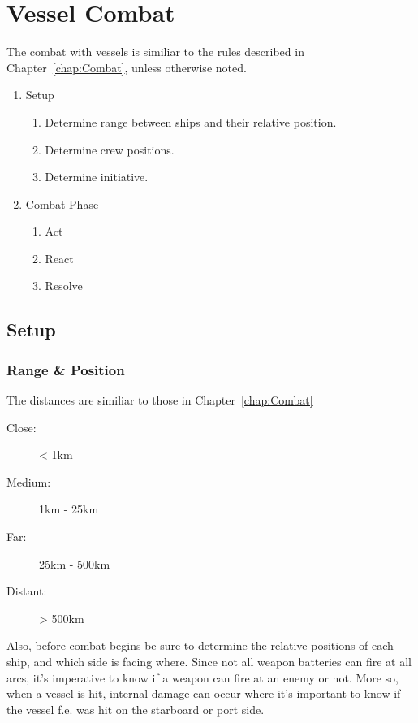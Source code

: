 \chapter{Vessel Combat}
\label{chap:Vessel-Combat}

The combat with vessels is similiar to the rules described in Chapter~\ref{chap:Combat}, unless otherwise noted.

\begin{enumerate}
  \item Setup
    \begin{enumerate}
      \item Determine range between ships and their relative position.
      \item Determine crew positions.
      \item Determine initiative.
    \end{enumerate}
  \item Combat Phase
    \begin{enumerate}
      \item Act
      \item React
      \item Resolve
    \end{enumerate}
\end{enumerate}

\section{Setup}
\label{sec:Vessels-Combat-Setup}

\subsection{Range \& Position}
\label{sub:Vessels-Combat-Setup-Range}

The distances are similiar to those in Chapter~\ref{chap:Combat}

\begin{description}
  \item[Close:] < 1km
  \item[Medium:] 1km - 25km
  \item[Far:] 25km - 500km
  \item[Distant:] > 500km
\end{description}

Also, before combat begins be sure to determine the relative positions of each ship, and which side is facing where. Since not all weapon batteries can fire at all arcs, it's imperative to know if a weapon can fire at an enemy or not. More so, when a vessel is hit, internal damage can occur where it's important to know if the vessel f.e. was hit on the starboard or port side.

